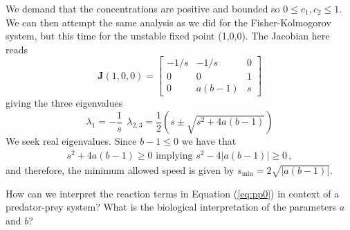 \begin{example}
	We demand that the concentrations are positive and bounded so $0 \leq c_1,c_2 \leq 1$. 
	We can then attempt the	same analysis as we did for the Fisher-Kolmogorov system, 
	but this time for the unstable fixed point (1,0,0). The Jacobian here reads 
	\begin{equation}
	\mathbf{J}(1,0,0) =
	\begin{bmatrix}
	  -1/s & -1/s & 0 \\
	  0 & 0 &1 \\
	  0 & a(b-1) & s
	\end{bmatrix}
	\end{equation}
	giving the three eigenvalues
	\begin{equation}
		\lambda_1 = -\frac{1}{s} \ \ \lambda_{2,3}=\frac{1}{2} \left(
		s \pm \sqrt{s^2 + 4a(b-1) }	\right)
	\end{equation}
	We seek real eigenvalues.  Since $b-1 \leq 0 $ we have that 
	\begin{eqnarray}
		s^2 + 4a(b-1) \geq 0 \text{ implying } s^2 - 4|a(b-1)| \geq 0 \, ,
	\end{eqnarray}
	and therefore, the minimum allowed speed is given by
	$s_\text{min} = 2\sqrt{|a(b-1)|}$.
\end{example}

\begin{question}
How can we interpret the reaction terms in Equation (\ref{eq:pp0}) in context of a
predator-prey system? What is the biological interpretation of the parameters
$a$ and $b$?
\end{question}


